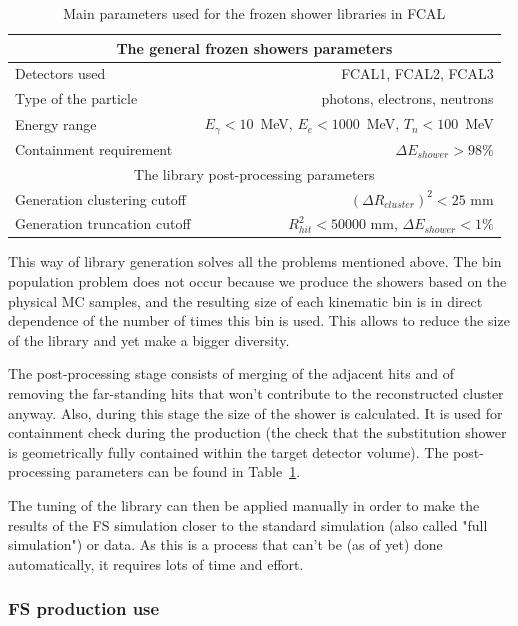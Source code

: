 \begin{table}
\centering
\begin{tabular}{l|r}
\hline
\hline
\multicolumn{2}{c}{The general frozen showers parameters} \\
\hline
Detectors used            & FCAL1, FCAL2, FCAL3 \\
Type of the particle      & photons, electrons, neutrons \\
Energy range              &  $E_{\gamma}<10$~MeV,  $E_{e}<1000$~MeV,  $T_n<100$~MeV \\
Containment requirement   & $\Delta E_{shower} > 98\%$\\
\hline
\multicolumn{2}{c}{The library post-processing parameters} \\
\hline
Generation clustering cutoff & $(\Delta R_{cluster})^{2} < 25$ mm\\
Generation truncation cutoff & $R_{hit}^{2} < 50000$ mm, $\Delta E_{shower} < 1\%$\\
\hline
\hline
\end{tabular}
\caption{Main parameters used for the frozen shower libraries in FCAL }
\label{tab:MC_FS_params}
\end{table}

This way of library generation solves all the problems mentioned above. The bin population problem does not occur because we produce the showers based on the physical MC samples, and the resulting size of each kinematic bin is in direct dependence of the number of times this bin is used. This allows to reduce the size of the library and yet make a bigger diversity.

The post-processing stage consists of merging of the adjacent hits and of removing the far-standing hits that won't contribute to the reconstructed cluster anyway. Also, during this stage the size of the shower is calculated. It is used for containment check during the production (the check that the substitution shower is geometrically fully contained within the target detector volume). The post-processing parameters can be found in Table~\ref{tab:MC_FS_params}.

The tuning of the library can then be applied manually in order to make the results of the FS simulation closer to the standard simulation (also called "full simulation") or data. As this is a process that can't be (as of yet) done automatically, it requires lots of time and effort.

\subsubsection{FS production use}
\label{sec:MC_FS_prod}

